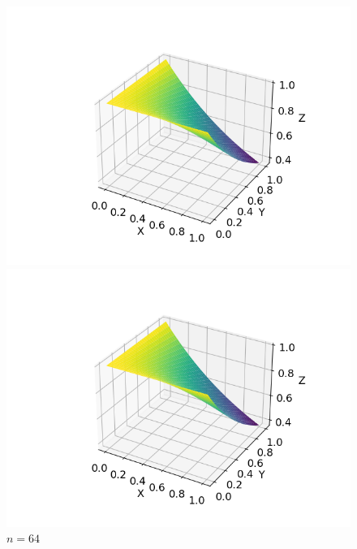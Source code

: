 \documentclass{ctexart}
\begin{document}
\begin{sloppypar}
\begin{figure}[H]
  \begin{minipage}[t]{0.5\linewidth}
    \centering
    \includegraphics[scale = 0.5]{f2_N_32.png}
    \caption{$n = 32$}
  \end{minipage}
  \begin{minipage}[t]{0.5\linewidth}
    \centering
    \includegraphics[scale = 0.5]{f2_N_64.png}
    \caption{$n = 64$}
  \end{minipage}
  \label{fig2}
\end{figure}


\end{sloppypar}
\end{document}
